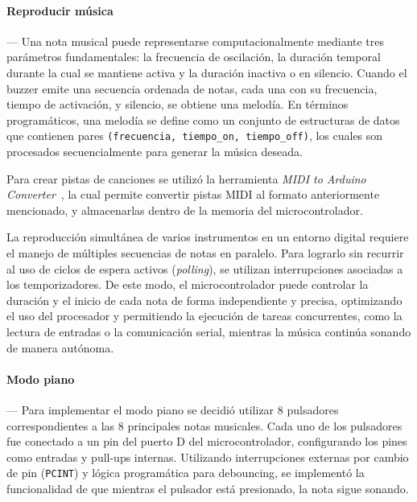     \vspace{1em}

    \paragraph*{\textbf{Reproducir música}}---
    Una nota musical puede representarse computacionalmente mediante tres parámetros fundamentales: la frecuencia de oscilación, la duración temporal durante la cual se mantiene activa y la duración inactiva o en silencio. Cuando el buzzer emite una secuencia ordenada de notas, cada una con su frecuencia, tiempo de activación, y silencio, se obtiene una melodía. En términos programáticos, una melodía se define como un conjunto de estructuras de datos que contienen pares \texttt{(frecuencia, tiempo\_on, tiempo\_off)}, los cuales son procesados secuencialmente para generar la música deseada.
    
    Para crear pistas de canciones se utilizó la herramienta \textit{MIDI to Arduino Converter}~\cite{arduino_midi_converter}, la cual permite convertir pistas MIDI al formato anteriormente mencionado, y almacenarlas dentro de la memoria del microcontrolador.

    \vspace{1em}

    La reproducción simultánea de varios instrumentos en un entorno digital requiere el manejo de múltiples secuencias de notas en paralelo. Para lograrlo sin recurrir al uso de ciclos de espera activos (\textit{polling}), se utilizan interrupciones asociadas a los temporizadores. De este modo, el microcontrolador puede controlar la duración y el inicio de cada nota de forma independiente y precisa, optimizando el uso del procesador y permitiendo la ejecución de tareas concurrentes, como la lectura de entradas o la comunicación serial, mientras la música continúa sonando de manera autónoma.

    \vspace{1em}

    \paragraph*{\textbf{Modo piano}}---
    Para implementar el modo piano se decidió utilizar 8 pulsadores correspondientes a las 8 principales notas musicales. Cada uno de los pulsadores fue conectado a un pin del puerto D del microcontrolador, configurando los pines como entradas y pull-ups internas. Utilizando interrupciones externas por cambio de pin (\texttt{PCINT}) y lógica programática para debouncing, se implementó la funcionalidad de que mientras el pulsador está presionado, la nota sigue sonando.

